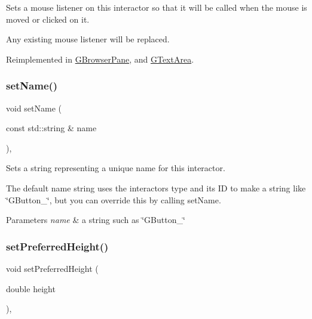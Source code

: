 Sets a mouse listener on this interactor so that it will be called when the mouse is moved or clicked on it. 

Any existing mouse listener will be replaced. 

Reimplemented in \mbox{\hyperlink{classsgl_1_1GBrowserPane_a3ed42c5f929cba378927916dd73e6576}{G\+Browser\+Pane}}, and \mbox{\hyperlink{classsgl_1_1GTextArea_a3ed42c5f929cba378927916dd73e6576}{G\+Text\+Area}}.

\mbox{\label{classsgl_1_1GInteractor_a9d3a2685df23b5e7cbf59c19c4a1f9b5}} 
\subsubsection{\texorpdfstring{set\+Name()}{setName()}}
{\footnotesize\ttfamily void set\+Name (\begin{DoxyParamCaption}\item[{const std\+::string \&}]{name }\end{DoxyParamCaption})\hspace{0.3cm}{\ttfamily [virtual]}, {\ttfamily [inherited]}}



Sets a string representing a unique name for this interactor. 

The default name string uses the interactor\textquotesingle{}s type and its ID to make a string like \char`\"{}\+G\+Button\+\_\char`\"{}, but you can override this by calling set\+Name. 
\begin{DoxyParams}{Parameters}
{\em name} & a string such as \char`\"{}\+G\+Button\+\_\char`\"{} \\
\hline
\end{DoxyParams}
\mbox{\label{classsgl_1_1GInteractor_a1ab987704fce32098706c6f00fb08218}} 
\subsubsection{\texorpdfstring{set\+Preferred\+Height()}{setPreferredHeight()}}
{\footnotesize\ttfamily void set\+Preferred\+Height (\begin{DoxyParamCaption}\item[{double}]{height }\end{DoxyParamCaption})\hspace{0.3cm}{\ttfamily [virtual]}, {\ttfamily [inherited]}}



